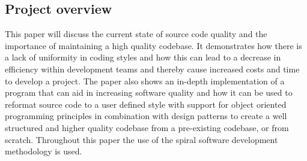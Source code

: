 \subsection{Project overview}
This paper will discuss the current state of source code quality and the importance of maintaining a high quality codebase. It demonstrates how there is a lack of uniformity in coding styles and how this can lead to a decrease in efficiency within development teams and thereby cause increased costs and time to develop a project.
The paper also shows an in-depth implementation of a program that can aid in increasing software quality and how it can be used to reformat source code to a user defined style with support for object oriented programming principles in combination with design patterns to create a well structured and higher quality codebase from a pre-existing codebase, or from scratch.
Throughout this paper the use of the spiral software development methodology is used.
